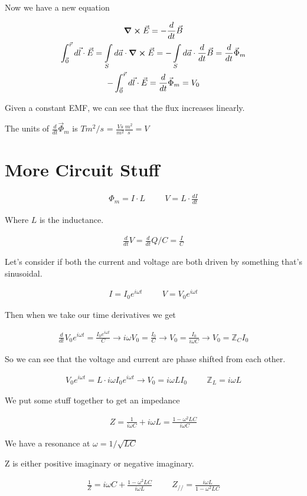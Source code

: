 \documentclass[fleqn]{report}
\newcommand{\hp}{\hspace{1cm}}
\newcommand{\equations} [1] {
\begin{gather*}
#1
\end{gather*}
}
\begin{document}
Now we have a new equation 
\equations{
    \curl \vec E 
    =
    - \frac{d}{dt} \vec B 
    \\ 
    \int^{\vec r}_{\vec 0}
    d \vec l \cdot \vec E 
    =
    \int\limits_S 
    d \vec a \cdot \curl \vec E 
    =
    -
    \int\limits_S 
    d \vec a \cdot 
    \frac{d}{dt} \vec B 
    = 
    \frac{d}{dt} \vec \Phi_m
    \\
    -\int^{\vec r}_{\vec 0}
    d \vec l \cdot \vec E 
    =
    \frac{d}{dt} \vec \Phi_m
    =
    V_0
}

Given a constant EMF, we can see that the flux increases linearly. 

The units of $\frac{d}{dt} \vec \Phi_m$ is 
$T m^2 / s$ = $\frac{V s}{m^2} \frac{m^2}{s} = V$ 

\section{More Circuit Stuff}
\equations{
    \Phi_m 
    =
    I \cdot L 
    \hp 
    V = L \cdot \frac{dI}{dt}
}
Where $L$ is the inductance. 

\equations{
    \frac{d}{dt} V 
    =
    \frac{d}{dt} Q / C 
    =
    \frac{I}{C}
}

Let's consider if both the current and voltage are both driven by 
something that's sinusoidal. 

\equations{
    I = I_0 e^{i \omega t}
    \hp
    V = V_0 e^{i \omega t}
}

Then when we take our time derivatives we get 
\equations{
    \frac{d}{dt} 
    V_0 e^{i \omega t}
    =
    \frac{I_0 e^{i \omega t}}{C}
    \rightarrow 
    i \omega V_0 = \frac{I_0}{C} 
    \rightarrow 
    V_0 = \frac{I_0}{i \omega C} 
    \rightarrow 
    V_0 = \mathbb Z_C I_0 
}

So we can see that the voltage and current are phase shifted from each other. 

\equations{
    V_0 e^{i \omega t}
    =
    L \cdot 
    i \omega I_0 e^{i \omega t}
    \rightarrow 
    V_0 = i \omega L I_0 
    \hp 
    \mathbb Z_L = i \omega L 
}

We put some stuff together to get an impedance 
\equations{
    Z 
    =
    \frac{1}{i \omega C }
    + i \omega L 
    =
    \frac{1 - \omega^2 L C }{i \omega C }
}
We have a resonance at $\omega = 1 / \sqrt{LC}$

Z is either positive imaginary or negative imaginary. 

\equations{
    \frac{1}{Z}
    =
    i \omega C 
    +
    \frac{1 - \omega^2 LC }{i \omega L}
    \hp 
    Z_{//} = \frac{i \omega L}{1 - \omega^2 L C}
}
\end{document}
